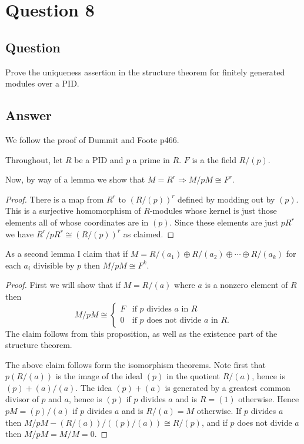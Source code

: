 \documentclass[11pt]{article}
\begin{document}
\section{Question 8}
\subsection{Question}
Prove the uniqueness assertion in the structure theorem for finitely generated modules over a PID.
\subsection{Answer}
We follow the proof of Dummit and Foote p466.

Throughout, let $R$ be a PID and $p$ a prime in $R$. $F$ is a the field $R/(p)$.

Now, by way of a lemma we show that $M=R^r \Rightarrow M/pM \cong F^r$.

\begin{proof}
There is a map from $R^r$ to $(R/(p))^r$ defined by modding out by $(p)$. This is a surjective homomorphism of $R$-modules whose kernel is just those elements all of whose coordinates are in $(p)$. Since these elements are just $pR^r$  we have $R^r / pR^r \cong (R/(p))^r$ as claimed.
\end{proof}

As a second lemma I claim that if $M = R / (a_1) \oplus R/(a_2) \oplus \cdots \oplus R / (a_k)$ for each $a_i$ divisible by $p$ then $M/pM \cong F^k.$

\begin{proof}
First we will show that if $M = R / (a)$ where $a$ is a nonzero element of $R$ then 
\[M / p M \cong \left\{ \begin{array}{ll} F & \mbox{if $p$ divides $a$ in $R$}\\0 & \mbox{if $p$ does not divide $a$ in $R$.}\end{array} \right.\]
The claim follows from this proposition, as well as the existence part of the structure theorem.

The above claim follows form the isomorphism theorems. Note first that $p(R/(a))$ is the image of the ideal $(p)$ in the quotient $R/(a)$, hence is $(p)+(a)/(a)$. The idea $(p)+(a)$ is generated by a greatest common divisor of $p$ and $a$, hence is $(p)$ if $p$ divides $a$ and is $R=(1)$ otherwise. Hence $pM =(p)/(a)$ if $p$ divides $a$ and is $R/(a)=M$ otherwise. If $p$ divides $a$ then $M/pM-(R/(a))/((p)/(a)) \cong R/(p)$, and if $p$ does not divide $a$ then $M/pM=M/M=0$.
\end{proof}
\end{document}
